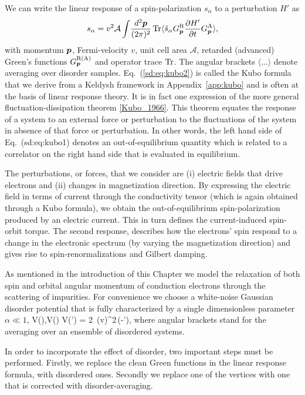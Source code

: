 We can write the linear response of a spin-polarization $s_\alpha$ to a perturbation $H'$ as
\begin{equation}
	s_\alpha = v^2\mathcal{A}\int\!\frac{d^2\boldsymbol{p}}{(2\pi)^2}\operatorname{Tr} \langle \hat{s}_\alpha G^\text{R}_{\boldsymbol{p}} \frac{\partial H'}{\partial t} G^\text{A}_{\boldsymbol{p}}\rangle,
\label{sd:eq:kubo2}
\end{equation}
with momentum $\boldsymbol{p}$, Fermi-velocity $v$, unit cell area $\mathcal{A}$, retarded (advanced) Green's functions $G^\text{R(A)}_{\boldsymbol{p}}$ and operator trace $\operatorname{Tr}$. The angular brackets $\langle\dots\rangle$ denote averaging over disorder samples. Eq.~(\ref{sd:eq:kubo2}) is called the Kubo formula that we derive from a Keldysh framework in Appendix~\ref{app:kubo} and is often at the basis of linear response theory. It is in fact one expression of the more general fluctuation-dissipation theorem \ref{Kubo_1966}. This theorem equates the response of a system to an external force or perturbation to the fluctuations of the system in absence of that force or perturbation. In other words, the left hand side of Eq.~(sd:eq:kubo1) denotes an out-of-equilibrium quantity which is related to a correlator on the right hand side that is evaluated in equilibrium. 

The perturbations, or forces, that we consider are (i) electric fields that drive electrons and (ii) changes in magnetization direction. By expressing the electric field in terms of current through the conductivity tensor (which is again obtained through a Kubo formula), we obtain the out-of-equilibrium spin-polarization produced by an electric current. This in turn defines the current-induced spin-orbit torque. The second response, describes how the electrons' spin respond to a change in the electronic spectrum (by varying the magnetization direction) and gives rise to spin-renormalizations and Gilbert damping. 

As mentioned in the introduction of this Chapter we model the relaxation of both spin and orbital angular momentum of conduction electrons through the scattering of impurities. For convenience we choose a white-noise Gaussian disorder potential that is fully characterized by a single dimensionless parameter $\alpha\ll 1$,
\be
\label{disorder}
\la V(),\quad \la V() V(') \ra = 2\pi \alpha\, (\hslash v)^2\,\delta(-'),
\e
where angular brackets stand for the averaging over an ensemble of disordered systems. 

In order to incorporate the effect of disorder, two important steps must be performed. Firstly, we replace the clean Green functions in the linear response formula, with disordered ones. Secondly we replace one of the vertices with one that is corrected with disorder-averaging.

